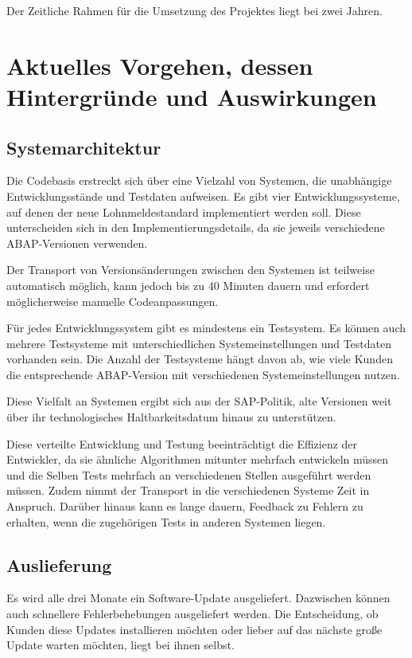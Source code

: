 Der Zeitliche Rahmen für die Umsetzung des Projektes liegt bei zwei Jahren.

\section{Aktuelles Vorgehen, dessen Hintergründe und Auswirkungen}

\subsection{Systemarchitektur}

Die Codebasis erstreckt sich über eine Vielzahl von Systemen, die unabhängige Entwicklungsstände und Testdaten aufweisen. 
Es gibt vier Entwicklungssysteme, auf denen der neue Lohnmeldestandard implementiert werden soll. Diese unterscheiden sich in den Implementierungsdetails, da sie jeweils verschiedene ABAP-Versionen verwenden.

Der Transport von Versionsänderungen zwischen den Systemen ist teilweise automatisch möglich, kann jedoch bis zu 40 Minuten dauern und erfordert möglicherweise manuelle Codeanpassungen.

Für jedes Entwicklungssystem gibt es mindestens ein Testsystem. Es können auch mehrere Testsysteme mit unterschiedlichen Systemeinstellungen und Testdaten vorhanden sein. Die Anzahl der Testsysteme hängt davon ab, wie viele Kunden die entsprechende ABAP-Version mit verschiedenen Systemeinstellungen nutzen.

Diese Vielfalt an Systemen ergibt sich aus der SAP-Politik, alte Versionen weit über ihr technologisches Haltbarkeitsdatum hinaus zu unterstützen.

Diese verteilte Entwicklung und Testung beeinträchtigt die Effizienz der Entwickler, da sie ähnliche Algorithmen mitunter mehrfach entwickeln müssen und die Selben Tests mehrfach an verschiedenen Stellen ausgeführt werden müssen.
Zudem nimmt der Transport in die verschiedenen Systeme Zeit in Anspruch. Darüber hinaus kann es lange dauern, Feedback zu Fehlern zu erhalten, wenn die zugehörigen Tests in anderen Systemen liegen.

\subsection{Auslieferung}

Es wird alle drei Monate ein Software-Update ausgeliefert. Dazwischen können auch schnellere Fehlerbehebungen ausgeliefert werden. Die Entscheidung, ob Kunden diese Updates installieren möchten oder lieber auf das nächste große Update warten möchten, liegt bei ihnen selbst.


